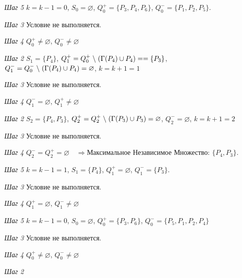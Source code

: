 \documentclass{article}
\begin{document}
\begin{enumerate}
\begin{enumerate}
    \item[\textit{Шаг 5}] $k = k - 1 = 0$,
        \quad $S_0 = \varnothing$,
        \quad $Q_0^{+} = \{P_3,P_4,P_6\}$,
        \quad  $Q_0^{-} = \{P_1,P_2,P_5\}$.
    \item[\textit{Шаг 3}]  Условие не выполняется.
    \item[\textit{Шаг 4}] $Q_0^{+} \neq \varnothing$,
    \quad$Q_0^{-} \neq \varnothing$
    \item[\textit{Шаг 2}]
        $S_1 = \{P_4\}$,
        \quad  $Q_1^{+} = Q_0^{+} \hspace{1mm}\backslash\hspace{1mm} (\Gamma (P_4) \cup P_4) = = \{P_3\}$,
        \quad  $Q_1^{-} = Q_0^{-} \hspace{1mm}\backslash\hspace{1mm} (\Gamma (P_4) \cup P_4) = \varnothing$,
        \quad  $k = k + 1 = 1$
    \item[\textit{Шаг 3}] Условие не выполняется.
    \item[\textit{Шаг 4}] $Q_1^{-} = \varnothing$,
    \quad$Q_1^{+} \neq \varnothing$
    \item[\textit{Шаг 2}]
        $S_2 = \{P_4, P_3\}$,
        \quad  $Q_2^{+} = Q_2^{+} \hspace{1mm}\backslash\hspace{1mm} (\Gamma (P_3) \cup P_3) = \varnothing$,
        \quad  $Q_2^{-} = \varnothing$,
        \quad  $k = k + 1 = 2$
    \item[\textit{Шаг 3}] Условие не выполняется.
    \item[\textit{Шаг 4}] $Q_2^{-} = Q_2^{+} = \varnothing\quad\Longrightarrow \textbf{Максимальное Независимое Множество: }\{P_4, P_3\}$.
    \item[\textit{Шаг 5}] $k = k - 1 = 1$,
        \quad $S_1 = \{P_4\}$,
        \quad $Q_1^{+} = \varnothing$,
        \quad  $Q_1^{-} = \{P_3\}$.
    \item[\textit{Шаг 3}] Условие не выполняется.
    \item[\textit{Шаг 4}] $Q_1^{+} = \varnothing$,
    \quad$Q_1^{-} \neq \varnothing$
    \item[\textit{Шаг 5}] $k = k - 1 = 0$,
        \quad $S_0 =\varnothing$,
        \quad  $Q_0^{+} = \{P_3,P_6\}$,
        \quad  $Q_0^{-} = \{P_5,P_1,P_2,P_4\}$
    \item[\textit{Шаг 3}]  Условие не выполняется.
    \item[\textit{Шаг 4}] $Q_0^{+} \neq \varnothing$,
    \quad$Q_0^{-} \neq \varnothing$
    \item[\textit{Шаг 2}]

\end{enumerate}
\end{enumerate}
\end{document}
